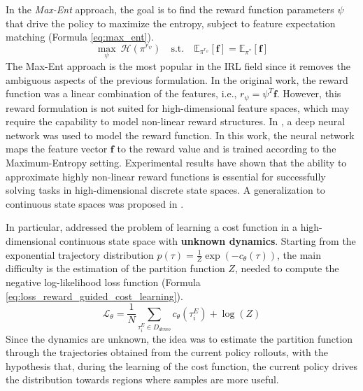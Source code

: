 In the \textit{Max-Ent} approach, the goal is to find the reward function parameters $\psi$ that drive the policy to maximize the entropy, subject to feature expectation matching (Formula \ref{eq:max_ent}).
\begin{equation}
    \label{eq:max_ent}
     \underset{\psi}{\max} \ \mathcal{H}(\pi^{r_{\psi}}) \quad \text{s.t.} \quad \mathbb{E}_{\pi^{r_{\psi}}}[\mathbf{f}] = \mathbb{E}_{\pi^{*}}[\mathbf{f}]
\end{equation}
The Max-Ent approach is the most popular in the IRL field since it removes the ambiguous aspects of the previous formulation. In the original work, the reward function was a linear combination of the features, i.e., $r_{\psi} = \psi^T \mathbf{f}$. However, this reward formulation is not suited for high-dimensional feature spaces, which may require the capability to model non-linear reward structures. In \cite{wulfmeier2015deep_inverse_rl}, a deep neural network was used to model the reward function. In this work, the neural network maps the feature vector $\mathbf{f}$ to the reward value and is trained according to the Maximum-Entropy setting. Experimental results have shown that the ability to approximate highly non-linear reward functions is essential for successfully solving tasks in high-dimensional discrete state spaces. A generalization to continuous state spaces was proposed in \cite{finn2016guided_cost_learning}. 

In particular, \cite{finn2016guided_cost_learning} addressed the problem of learning a cost function in a high-dimensional continuous state space with \textbf{unknown dynamics}. Starting from the exponential trajectory distribution $p(\tau) = \frac{1}{Z} \exp(-c_{\theta}(\tau))$,
the main difficulty is the estimation of the partition function $Z$, needed to compute the negative log-likelihood loss function (Formula \ref{eq:loss_reward_guided_cost_learning}).
\begin{equation}
    \label{eq:loss_reward_guided_cost_learning}
    \mathcal{L}_{\theta} = \frac{1}{N} \sum_{\tau^{E}_{i} \in D_{demo}} c_{\theta}(\tau^{E}_{i}) + \log(Z)
\end{equation}
Since the dynamics are unknown, the idea was to estimate the partition function through the trajectories obtained from the current policy rollouts, with the hypothesis that, during the learning of the cost function, the current policy drives the distribution towards regions where samples are more useful.



